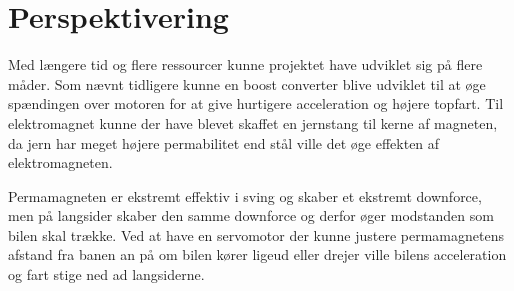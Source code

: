 \section{Perspektivering}
Med længere tid og flere ressourcer kunne projektet have udviklet sig på flere måder. Som nævnt tidligere kunne en boost converter blive udviklet til at øge spændingen over motoren for at give hurtigere acceleration og højere topfart. Til elektromagnet kunne der have blevet skaffet en jernstang til kerne af magneten, da jern har meget højere permabilitet end stål ville det øge effekten af elektromagneten. 

Permamagneten er ekstremt effektiv i sving og skaber et ekstremt downforce, men på langsider skaber den samme downforce og derfor øger modstanden som bilen skal trække. Ved at have en servomotor der kunne justere permamagnetens afstand fra banen an på om bilen kører ligeud eller drejer ville bilens acceleration og fart stige ned ad langsiderne. 